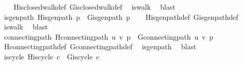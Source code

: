 \begin{isabellebody}
%
\isadelimproof
\ \ %
\endisadelimproof
%
\isatagproof
{}\isamarkupfalse%
\ H{\isachardot}{\kern0pt}is{\isacharunderscore}{\kern0pt}closed{\isacharunderscore}{\kern0pt}walk{\isacharunderscore}{\kern0pt}def\ G{\isachardot}{\kern0pt}is{\isacharunderscore}{\kern0pt}closed{\isacharunderscore}{\kern0pt}walk{\isacharunderscore}{\kern0pt}def\ \isamarkupfalse%
\ is{\isacharunderscore}{\kern0pt}walk\ \isamarkupfalse%
\ blast%
\endisatagproof
{\isafoldproof}%
%
\isadelimproof
\isanewline
%
\endisadelimproof
\isanewline
{}\isamarkupfalse%
\ is{\isacharunderscore}{\kern0pt}gen{\isacharunderscore}{\kern0pt}path{\isacharcolon}{\kern0pt}\ {\isachardoublequoteopen}H{\isachardot}{\kern0pt}is{\isacharunderscore}{\kern0pt}gen{\isacharunderscore}{\kern0pt}path\ p\ {\isasymLongrightarrow}\ G{\isachardot}{\kern0pt}is{\isacharunderscore}{\kern0pt}gen{\isacharunderscore}{\kern0pt}path\ p{\isachardoublequoteclose}\isanewline
%
\isadelimproof
\ \ %
\endisadelimproof
%
\isatagproof
{}\isamarkupfalse%
\ H{\isachardot}{\kern0pt}is{\isacharunderscore}{\kern0pt}gen{\isacharunderscore}{\kern0pt}path{\isacharunderscore}{\kern0pt}def\ G{\isachardot}{\kern0pt}is{\isacharunderscore}{\kern0pt}gen{\isacharunderscore}{\kern0pt}path{\isacharunderscore}{\kern0pt}def\ \isamarkupfalse%
\ is{\isacharunderscore}{\kern0pt}walk\ \isamarkupfalse%
\ blast%
\endisatagproof
{\isafoldproof}%
%
\isadelimproof
\isanewline
%
\endisadelimproof
\isanewline
{}\isamarkupfalse%
\ connecting{\isacharunderscore}{\kern0pt}path{\isacharcolon}{\kern0pt}\ {\isachardoublequoteopen}H{\isachardot}{\kern0pt}connecting{\isacharunderscore}{\kern0pt}path\ u\ v\ p\ {\isasymLongrightarrow}\ G{\isachardot}{\kern0pt}connecting{\isacharunderscore}{\kern0pt}path\ u\ v\ p{\isachardoublequoteclose}\isanewline
%
\isadelimproof
\ \ %
\endisadelimproof
%
\isatagproof
{}\isamarkupfalse%
\ H{\isachardot}{\kern0pt}connecting{\isacharunderscore}{\kern0pt}path{\isacharunderscore}{\kern0pt}def\ G{\isachardot}{\kern0pt}connecting{\isacharunderscore}{\kern0pt}path{\isacharunderscore}{\kern0pt}def\ \isamarkupfalse%
\ is{\isacharunderscore}{\kern0pt}gen{\isacharunderscore}{\kern0pt}path\ \isamarkupfalse%
\ blast%
\endisatagproof
{\isafoldproof}%
%
\isadelimproof
\isanewline
%
\endisadelimproof
\isanewline
{}\isamarkupfalse%
\ is{\isacharunderscore}{\kern0pt}cycle{\isacharcolon}{\kern0pt}\ {\isachardoublequoteopen}H{\isachardot}{\kern0pt}is{\isacharunderscore}{\kern0pt}cycle\ c\ {\isasymLongrightarrow}\ G{\isachardot}{\kern0pt}is{\isacharunderscore}{\kern0pt}cycle\ c{\isachardoublequoteclose}\isanewline

\end{isabellebody}
